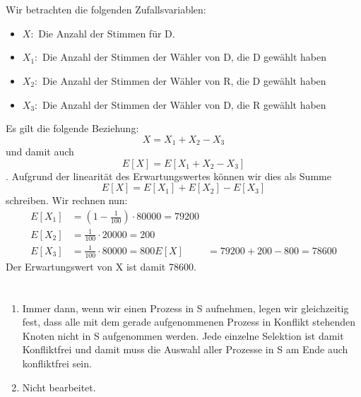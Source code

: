 \documentclass[a4paper]{article}
\begin{document}
	\maketitle
	\section{}
	Wir betrachten die folgenden Zufallsvariablen:
	\begin{itemize}
	\item $X:$ Die Anzahl der Stimmen für D.
	\item $X_1:$ Die Anzahl der Stimmen der Wähler von D, die D gewählt haben
	\item $X_2:$ Die Anzahl der Stimmen der Wähler von R, die D gewählt haben
	\item $X_3:$ Die Anzahl der Stimmen der Wähler von D, die R gewählt haben
	\end{itemize}
Es gilt die folgende Beziehung:
\[
	X = X_1 + X_2 - X_3
\] und damit auch \[
	E[X] = E[X_1 + X_2 - X_3]
\]. Aufgrund der linearität des Erwartungswertes können wir dies als Summe
\[
	E[X] = E[X_1] + E[X_2] - E[X_3]
\] schreiben. Wir rechnen nun:
\begin{align*}
E[X_1] &= (1-\frac{1}{100}) \cdot 80000 = 79200 \\
E[X_2] &= \frac{1}{100} \cdot 20000 = 200 \\
E[X_3] &= \frac{1}{100} \cdot 80000 = 800
E[X] &= 79200 + 200 - 800 = 78600
\end{align*}
Der Erwartungswert von X ist damit 78600.

\section{}
\begin{enumerate}
\item Immer dann, wenn wir einen Prozess in S aufnehmen, legen wir gleichzeitig fest, dass alle mit dem gerade aufgenommenen Prozess in Konflikt stehenden Knoten nicht in S aufgenommen werden. Jede einzelne Selektion ist damit Konfliktfrei und damit muss die Auswahl aller Prozesse in S am Ende auch konfliktfrei sein.

\item Nicht bearbeitet.
\end{enumerate}
\end{document}
